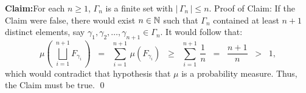 	\begin{center}
	\begin{minipage}{6.5in}
	\vskip 0.1cm
	\noindent
	\textbf{Claim:}\;\;For each $n \geq 1$, $\Gamma_{n}$ is a finite set with $\left\vert\,\Gamma_{n}\,\right\vert \leq n$.
	\vskip 0.2cm
	\noindent
	Proof of Claim:\quad
	If the Claim were false, there would exist $n \in \mathbb{N}$ such that $\Gamma_{n}$ contained at least $n+1$ distinct elements,
	say $\gamma_{1}, \gamma_{2}, \ldots, \gamma_{n+1} \in \Gamma_{n}$.
	It would follow that:
	\begin{equation*}
	\mu\!\left(\;\bigsqcup_{i=1}^{n+1} F_{\gamma_{i}}\,\right)
	\;\;=\;\; \sum_{i=1}^{n+1}\,\mu\!\left(F_{\gamma_{i}}\right)
	\;\;\geq\;\; \sum_{i=1}^{n+1}\,\dfrac{1}{n}
	\;\;=\;\;\dfrac{n+1}{n}
	\;\;>\;\; 1,
	\end{equation*}
	which would contradict that hypothesis that $\mu$ is a probability measure.
	Thus, the Claim must be true. \qed
	\end{minipage}
	\end{center}

